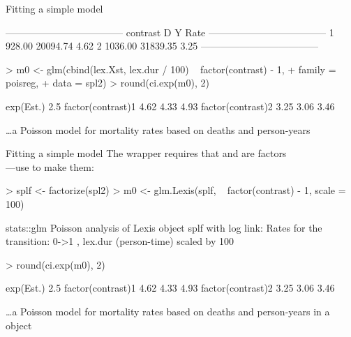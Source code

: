 \begin{frame}[fragile]{Fitting a simple model}
\begin{Schunk}
\begin{Soutput}
 ------------------------------------ 
 contrast         D        Y    Rate  
 ------------------------------------ 
 1           928.00 20094.74    4.62  
 2          1036.00 31839.35    3.25  
 ------------------------------------ 
\end{Soutput}
\end{Schunk}
\begin{Schunk}
\begin{Sinput}
> m0 <- glm(cbind(lex.Xst, lex.dur / 100) ~ factor(contrast) - 1,
+           family = poisreg,
+             data = spl2)
> round(ci.exp(m0), 2)
\end{Sinput}
\begin{Soutput}
                  exp(Est.) 2.5%
factor(contrast)1      4.62 4.33  4.93
factor(contrast)2      3.25 3.06  3.46
\end{Soutput}
\end{Schunk}
\small
\ldots a Poisson model for mortality rates based on deaths and person-years
\end{frame}

\begin{frame}[fragile]{Fitting a simple model}
\small
The wrapper  requires that  and 
are factors\\---use  to make them:
\begin{Schunk}
\begin{Sinput}
> splf <- factorize(spl2)
> m0 <- glm.Lexis(splf, ~ factor(contrast) - 1, scale = 100)
\end{Sinput}
\begin{Soutput}
stats::glm Poisson analysis of Lexis object splf with log link:
Rates for the transition:
0->1
, lex.dur (person-time) scaled by 100
\end{Soutput}
\begin{Sinput}
> round(ci.exp(m0), 2)
\end{Sinput}
\begin{Soutput}
                  exp(Est.) 2.5%
factor(contrast)1      4.62 4.33  4.93
factor(contrast)2      3.25 3.06  3.46
\end{Soutput}
\end{Schunk}
\small
\ldots a Poisson model for mortality rates based on deaths and
person-years in a  object
\end{frame}

